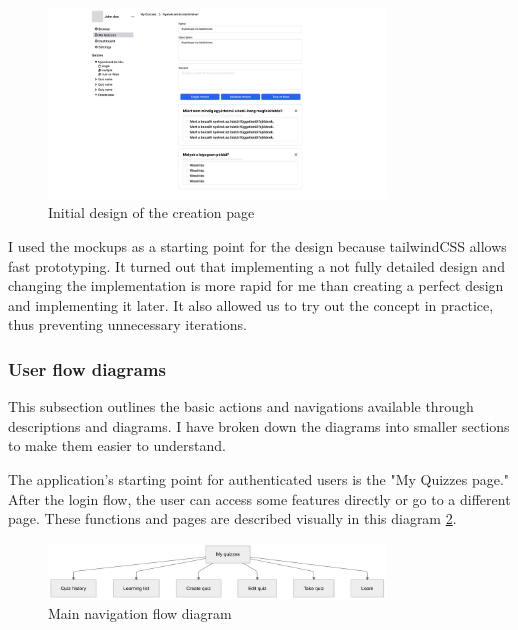 \begin{figure}[H]
    \centering
    \includegraphics[width=0.8\textwidth, keepaspectratio]{figures/quiz-creation-page-initial-design.png}
    \caption{Initial design of the creation page}
    \label{fig:quiz-creation-page-initial-design}
\end{figure}

I used the mockups as a starting point for the design because tailwindCSS allows fast prototyping. It turned out that implementing a not fully detailed design and changing the implementation is more rapid for me than creating a perfect design and implementing it later. It also allowed us to try out the concept in practice, thus preventing unnecessary iterations.

\subsubsection{User flow diagrams}

This subsection outlines the basic actions and navigations available through descriptions and diagrams. I have broken down the diagrams into smaller sections to make them easier to understand. 

The application's starting point for authenticated users is the "My Quizzes page." After the login flow, the user can access some features directly or go to a different page. These functions and pages are described visually in this diagram \ref{fig:flow-main}.

\begin{figure}[H]
    \centering
    \includegraphics[width=0.8\textwidth, keepaspectratio]{figures/flow-main.png}
    \caption{Main navigation flow diagram}
    \label{fig:flow-main}
\end{figure}

